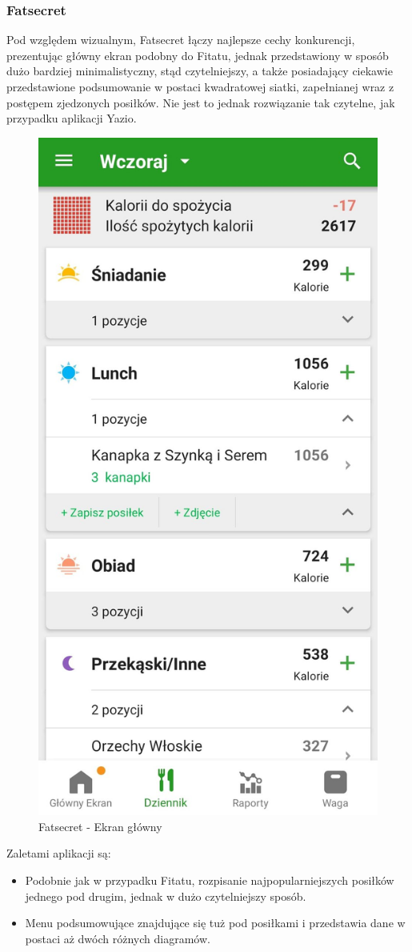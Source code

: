 \documentclass[12pt, a4paper]{article}
\begin{document}
\begin{sloppypar}
{{    \subsubsection{Fatsecret}
    {
      Pod względem wizualnym, Fatsecret łączy najlepsze cechy konkurencji, prezentując
      główny ekran podobny do Fitatu, jednak przedstawiony w sposób dużo bardziej 
      minimalistyczny, stąd czytelniejszy, a także posiadający ciekawie przedstawione 
      podsumowanie w postaci kwadratowej siatki, zapełnianej wraz z postępem zjedzonych posiłków.
      Nie jest to jednak rozwiązanie tak czytelne, jak przypadku aplikacji Yazio.
      \begin{figure}[H]
        \centering
        \includegraphics[width=.4\textwidth]{fatsecret_1.png}
        \caption{Fatsecret - Ekran główny}
        \label{fig:fat1}
      \end{figure} 
      Zaletami aplikacji są:
      \begin{itemize}
        \item Podobnie jak w przypadku Fitatu, rozpisanie najpopularniejszych posiłków
        jednego pod drugim, jednak w dużo czytelniejszy sposób. 
        \item Menu podsumowujące znajdujące się tuż pod posiłkami i przedstawia dane w
        postaci aż dwóch różnych diagramów.
        \begin{figure}[H]
          \centering

\end{figure}
\end{itemize}}}}
\end{sloppypar}
\end{document}

